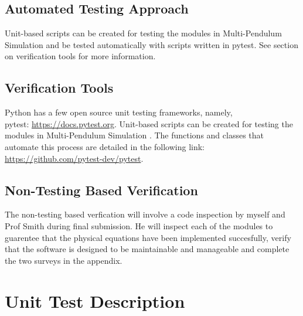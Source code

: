 \documentclass[12pt, titlepage]{article}
\newcommand{\progname}{Multi-Pendulum Simulation }
\begin{document}
\subsection{Automated Testing Approach}

Unit-based scripts can be created for testing the modules in \progname{}and be tested automatically with 
scripts written in pytest. See section on verification tools for more information.

\subsection{Verification Tools}

Python has a few open source unit testing frameworks, namely, \\pytest: \url{https://docs.pytest.org}. 
Unit-based scripts can be created for testing the modules in \progname. The functions and classes that automate 
this process are detailed in the following link: 
\url{https://github.com/pytest-dev/pytest}.\\

		

\subsection{Non-Testing Based Verification}

The non-testing based verfication will involve a code inspection by myself and
Prof Smith during final submission. He will inspect each of the modules to guarentee that the 
physical equations have been implemented succesfully, verify that the software 
is designed to be maintainable and manageable and complete the 
two surveys in the appendix.\\

\section{Unit Test Description}
\end{document}
